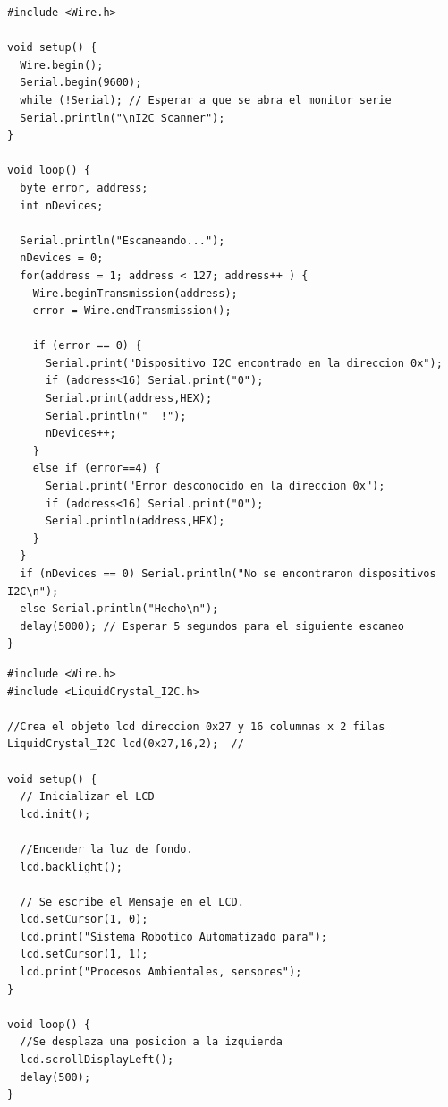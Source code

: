 \begin{lstlisting}[caption={La comunidad de Arduino ha creado este código para escanear la dirección hexadecimal I2C e identificarla de forma sencilla~\cite{ArduinoPlaygroundScanner}.}, label={lst:i2c_scanner}]
#include <Wire.h>

void setup() {
  Wire.begin();
  Serial.begin(9600);
  while (!Serial); // Esperar a que se abra el monitor serie
  Serial.println("\nI2C Scanner");
}

void loop() {
  byte error, address;
  int nDevices;

  Serial.println("Escaneando...");
  nDevices = 0;
  for(address = 1; address < 127; address++ ) {
    Wire.beginTransmission(address);
    error = Wire.endTransmission();

    if (error == 0) {
      Serial.print("Dispositivo I2C encontrado en la direccion 0x");
      if (address<16) Serial.print("0");
      Serial.print(address,HEX);
      Serial.println("  !");
      nDevices++;
    }
    else if (error==4) {
      Serial.print("Error desconocido en la direccion 0x");
      if (address<16) Serial.print("0");
      Serial.println(address,HEX);
    }    
  }
  if (nDevices == 0) Serial.println("No se encontraron dispositivos I2C\n");
  else Serial.println("Hecho\n");
  delay(5000); // Esperar 5 segundos para el siguiente escaneo
}
\end{lstlisting}

\vspace{5mm}

\begin{lstlisting}[caption={Ejemplo de código para utilizar una LCD de $16 \times 2$ con módulo de I2C en Arduino~\cite{NaylampLCD}.}, label={lst:lcd_i2c}]
#include <Wire.h> 
#include <LiquidCrystal_I2C.h>

//Crea el objeto lcd direccion 0x27 y 16 columnas x 2 filas
LiquidCrystal_I2C lcd(0x27,16,2);  //

void setup() {
  // Inicializar el LCD
  lcd.init();
  
  //Encender la luz de fondo.
  lcd.backlight();
  
  // Se escribe el Mensaje en el LCD.
  lcd.setCursor(1, 0);
  lcd.print("Sistema Robotico Automatizado para");
  lcd.setCursor(1, 1);
  lcd.print("Procesos Ambientales, sensores");
}

void loop() {
  //Se desplaza una posicion a la izquierda
  lcd.scrollDisplayLeft(); 
  delay(500);
}
\end{lstlisting}


